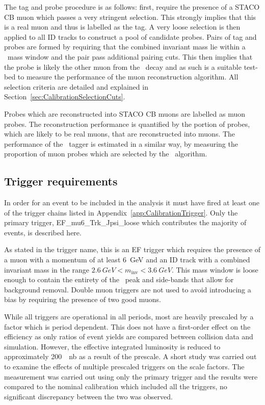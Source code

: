 The tag and probe procedure is as follows: first, require the presence of a STACO CB muon which passes a very stringent selection. This strongly implies that this is a real muon and thus is labelled as the tag. A very loose selection is then applied to all ID tracks to construct a pool of candidate probes. Pairs of tag and probes are formed by requiring that the combined invariant mass lie within a \jpsi\ mass window and the pair pass additional pairing cuts. This then implies that the probe is likely the other muon from the \jpsi\ decay and as such is a suitable test-bed to measure the performance of the muon reconstruction algorithm. All selection criteria are detailed and explained in Section~\ref{sec:CalibrationSelectionCuts}.

Probes which are reconstructed into STACO CB muons are labelled as muon probes. The reconstruction performance is quantified by the portion of probes, which are likely to be real muons, that are reconstructed into muons. The performance of the \xsm\ tagger is estimated in a similar way, by measuring the proportion of muon probes which are selected by the \xsm\ algorithm.

\subsection{Trigger requirements}\label{sec:CalibrationTriggerRequirement}

In order for an event to be included in the analysis it must have fired at least one of the trigger chains listed in Appendix~\ref{app:CalibrationTrigger}. Only the primary trigger, EF\_mu6\_Trk\_Jpsi\_loose which contributes the majority of events, is described here.

As stated in the trigger name, this is an EF trigger which requires the presence of a muon with a momentum of at least \SI{6}{GeV} and an ID track with a combined invariant mass in the range $\SI{2.6}{GeV}<m_{\textrm{inv}}<\SI{3.6}{GeV}$. This mass window is loose enough to   contain the entirety of the \jpsi\ peak and side-bands that allow for background removal. Double muon triggers are not used to avoid introducing a bias by requiring the presence of two good muons. 

While all triggers are operational in all periods, most are heavily prescaled by a factor which is period dependent. This does not have a first-order effect on the efficiency as only ratios of event yields are compared between collision data and simulation. However, the effective integrated luminosity is reduced to approximately \SI{200}{\per\nano\barn} as a result of the prescale. A short study was carried out to examine the effects of multiple prescaled triggers on the scale factors. The measurement was carried out using only the primary trigger and the results were compared to the nominal calibration which included all the triggers, no significant discrepancy between the two was observed.

